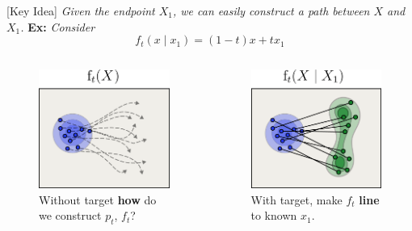 \documentclass{beamer}
\begin{document}
\begin{frame}
    [Key Idea]{
    \emph{Given the endpoint \( X_{1} \), we can easily construct a path between \( X \) and \( X_{1} \).}
    }
    \textbf{Ex:} \emph{Consider} \[ f_t(x \mid x_{1}) = (1 - t)x + tx_{1} \]
    \vskip 3pt
    \begin{columns}
        \begin{column}{0.49\linewidth}
        \begin{figure}
            \centering
            \includegraphics[width=0.8\linewidth]{figures/marginal-path.png}
            \caption{Without target \textbf{how} do we construct \( p_t \), \( f_t \)?}
        \end{figure}
        \end{column}
        \begin{column}{0.49\linewidth}
        \begin{figure}
            \centering
            \includegraphics[width=0.8\linewidth]{figures/conditional-path.png}
            \caption{With target, make \( f_t \) \textbf{line} to known \( x_{1} \).}
        \end{figure}
        \end{column}
    \end{columns}
\end{frame}
\end{document}
